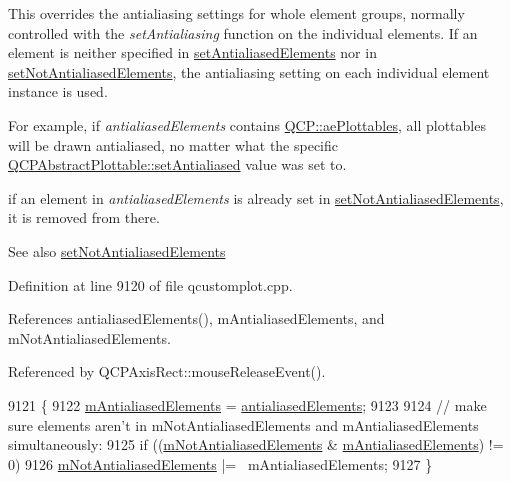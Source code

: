 This overrides the antialiasing settings for whole element groups, normally controlled with the {\itshape set\+Antialiasing} function on the individual elements. If an element is neither specified in \hyperlink{class_q_custom_plot_af6f91e5eab1be85f67c556e98c3745e8}{set\+Antialiased\+Elements} nor in \hyperlink{class_q_custom_plot_ae10d685b5eabea2999fb8775ca173c24}{set\+Not\+Antialiased\+Elements}, the antialiasing setting on each individual element instance is used.

For example, if {\itshape antialiased\+Elements} contains \hyperlink{namespace_q_c_p_ae55dbe315d41fe80f29ba88100843a0ca4145e4251b0cf2dbedabeea0a38f84f6}{Q\+C\+P\+::ae\+Plottables}, all plottables will be drawn antialiased, no matter what the specific \hyperlink{class_q_c_p_layerable_a4fd43e89be4a553ead41652565ff0581}{Q\+C\+P\+Abstract\+Plottable\+::set\+Antialiased} value was set to.

if an element in {\itshape antialiased\+Elements} is already set in \hyperlink{class_q_custom_plot_ae10d685b5eabea2999fb8775ca173c24}{set\+Not\+Antialiased\+Elements}, it is removed from there.

\begin{DoxySeeAlso}{See also}
\hyperlink{class_q_custom_plot_ae10d685b5eabea2999fb8775ca173c24}{set\+Not\+Antialiased\+Elements} 
\end{DoxySeeAlso}


Definition at line 9120 of file qcustomplot.\+cpp.



References antialiased\+Elements(), m\+Antialiased\+Elements, and m\+Not\+Antialiased\+Elements.



Referenced by Q\+C\+P\+Axis\+Rect\+::mouse\+Release\+Event().


\begin{DoxyCode}
9121 \{
9122   \hyperlink{class_q_custom_plot_aa333200629256830e273873b582a5524}{mAntialiasedElements} = \hyperlink{class_q_custom_plot_a81e954fbb485bb44c609e5707f0067b3}{antialiasedElements};
9123   
9124   \textcolor{comment}{// make sure elements aren't in mNotAntialiasedElements and mAntialiasedElements simultaneously:}
9125   \textcolor{keywordflow}{if} ((\hyperlink{class_q_custom_plot_a2b6ebcad00a90ba07f146cefcd4293da}{mNotAntialiasedElements} & \hyperlink{class_q_custom_plot_aa333200629256830e273873b582a5524}{mAntialiasedElements}) != 0)
9126     \hyperlink{class_q_custom_plot_a2b6ebcad00a90ba07f146cefcd4293da}{mNotAntialiasedElements} |= ~mAntialiasedElements;
9127 \}
\end{DoxyCode}


